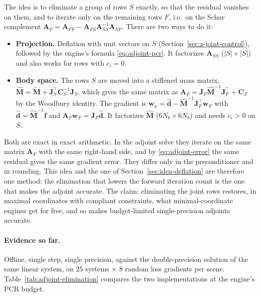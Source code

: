 The idea is to eliminate a group of rows $S$ exactly, so that the residual
vanishes on them, and to iterate only on the remaining rows $F$, i.e.\ on
the Schur complement
$\mathbf{A}_F = \mathbf{A}_{FF} - \mathbf{A}_{FS}\mathbf{A}_{SS}^{-1}\mathbf{A}_{SF}$.
There are two ways to do it:
\begin{itemize}
  \item \textbf{Projection.} Deflation with unit vectors on $S$
    (Section~\ref{sec:z-joint-control}), followed by the engine's formula
    \eqref{eq:adjoint-pcr}. It factorizes $\mathbf{A}_{SS}$
    ($|S| \times |S|$) and also works for rows with $c_i = 0$.
  \item \textbf{Body space.} The rows $S$ are moved into a stiffened mass
    matrix,
    $\hat{\mathbf{M}} = \tilde{\mathbf{M}} + \mathbf{J}_S^\top\mathbf{C}_S^{-1}\mathbf{J}_S$,
    which gives the same matrix as
    $\mathbf{A}_F = \mathbf{J}_F\hat{\mathbf{M}}^{-1}\mathbf{J}_F^\top + \mathbf{C}_F$
    by the Woodbury identity. The gradient is
    $\mathbf{w}_u = \hat{\mathbf{d}} - \hat{\mathbf{M}}^{-1}\mathbf{J}_F^\top\mathbf{w}_F$
    with $\hat{\mathbf{d}} = \hat{\mathbf{M}}^{-1}\mathbf{f}$ and
    $\mathbf{A}_F\mathbf{w}_F = \mathbf{J}_F\hat{\mathbf{d}}$. It factorizes
    $\hat{\mathbf{M}}$ ($6N_b \times 6N_b$) and needs $c_i > 0$ on $S$.
\end{itemize}
Both are exact in exact arithmetic. In the adjoint solve they iterate on
the same matrix $\mathbf{A}_F$ with the same right-hand side, and by
\eqref{eq:adjoint-error} the same residual gives the same gradient error.
They differ only in the preconditioner and in rounding. This idea and
the one of Section~\ref{sec:idea-deflation} are therefore one method: the
elimination that lowers the forward iteration count is the one that makes
the adjoint accurate. The claim: eliminating the joint rows restores, in
maximal coordinates with compliant constraints, what minimal-coordinate
engines get for free, and so makes budget-limited single-precision
adjoints accurate.

\paragraph{Evidence so far.}
Offline, single step, single precision, against the double-precision
solution of the same linear system, on $25$ systems $\times$ $8$ random
loss gradients per scene. Table~\ref{tab:adjoint-elimination} compares
the two implementations at the engine's PCR budget.


